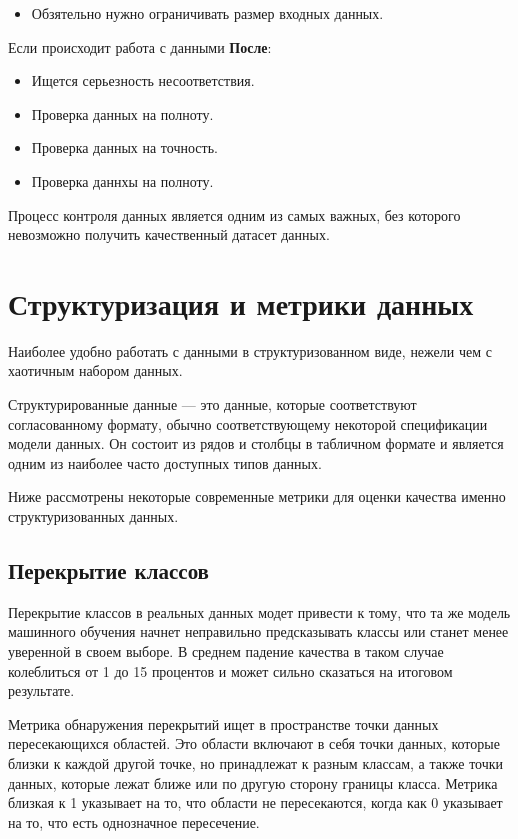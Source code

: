 \documentclass{article}
\begin{document}
\begin{itemize}
    \item Обзятельно нужно ограничивать размер входных данных.
\end{itemize}

Если происходит работа с данными \textbf{После}:

\begin{itemize}
    \item Ищется серьезность несоответствия.
    \item Проверка данных на полноту.
    \item Проверка данных на точность.
    \item Проверка даннхы на полноту.
\end{itemize}

Процесс контроля данных является одним из самых важных, без которого невозможно получить качественный датасет данных.

\newpage

\section{Структуризация и метрики данных}

Наиболее удобно работать с данными в структуризованном виде, нежели чем с хаотичным набором данных. 

Структурированные данные — это данные, которые соответствуют согласованному формату, обычно соответствующему некоторой спецификации модели данных. Он состоит из рядов и столбцы в табличном формате и является одним из наиболее часто доступных типов данных.

Ниже рассмотрены некоторые современные метрики для оценки качества именно структуризованных данных.

\subsection{Перекрытие классов}

Перекрытие классов в реальных данных модет привести к тому, что та же модель машинного обучения начнет неправильно предсказывать классы или станет менее уверенной в своем выборе. В среднем падение качества в таком случае колеблиться от 1 до 15 процентов и может сильно сказаться на итоговом результате.

Метрика обнаружения перекрытий ищет в пространстве точки данных пересекающихся областей. Это области включают в себя точки данных, которые близки к каждой другой точке, но принадлежат к разным классам, а также точки данных, которые лежат ближе или по другую сторону границы класса. Метрика близкая к 1 указывает на то, что области не пересекаются, когда как 0 указывает на то, что есть однозначное пересечение.
\end{document}
